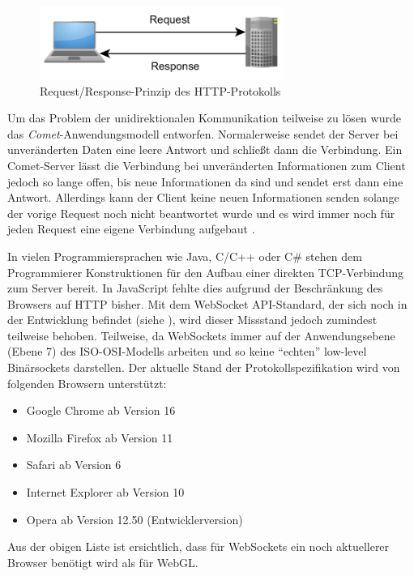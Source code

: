 \begin{figure}
\centering
\includegraphics[width=80mm]{bilder/http.png}
\caption{Request/Response-Prinzip des HTTP-Protokolls}
\label{fig:http}
\end{figure}
Um das Problem der unidirektionalen Kommunikation teilweise zu lösen wurde das \textit{Comet}-Anwendungsmodell entworfen. Normalerweise sendet der Server bei unveränderten Daten eine leere Antwort und schließt dann die Verbindung. Ein Comet-Server lässt die Verbindung bei unveränderten Informationen zum Client jedoch so lange offen, bis neue Informationen da sind und sendet erst dann eine Antwort. Allerdings kann der Client keine neuen Informationen senden solange der vorige Request noch nicht beantwortet wurde und es wird immer noch für jeden Request eine eigene Verbindung aufgebaut \autocite[673]{WebsocketsFurukawa}.

In vielen Programmiersprachen wie Java, C/C++ oder C\# stehen dem Programmierer Konstruktionen für den Aufbau einer direkten TCP-Verbindung zum Server bereit. In JavaScript fehlte dies aufgrund der Beschränkung des Browsers auf HTTP bisher. Mit dem WebSocket API-Standard, der sich noch in der Entwicklung befindet (siehe \autocite{WebSocketApiSpec}), wird dieser Missstand jedoch zumindest teilweise behoben. Teilweise, da WebSockets immer auf der Anwendungsebene (Ebene 7) des ISO-OSI-Modells arbeiten \autocite{WebsocketsRichter} und so keine "`echten"' low-level Binärsockets darstellen. Der aktuelle Stand der Protokollspezifikation \autocite{WebSocketRFC} wird von folgenden Browsern unterstützt:
\begin{itemize}
    \item Google Chrome ab Version 16
    \item Mozilla Firefox ab Version 11
    \item Safari ab Version 6
    \item Internet Explorer ab Version 10
    \item Opera ab Version 12.50 (Entwicklerversion)
\end{itemize}
Aus der obigen Liste ist ersichtlich, dass für WebSockets ein noch aktuellerer Browser benötigt wird als für WebGL.

